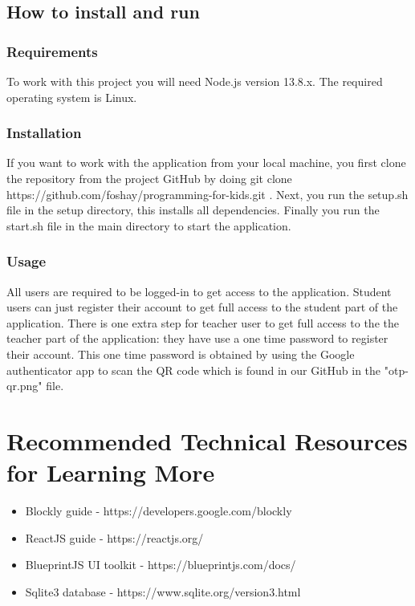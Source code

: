 \documentclass[draftclsnofoot,10pt,onecolumn]{IEEEtran}
\begin{document}

\subsection{How to install and run}
\subsubsection{Requirements}
To work with this project you will need Node.js version 13.8.x. The required operating system is Linux.
\subsubsection{Installation}
If you want to work with the application from your local machine, you first clone the repository from the project GitHub by doing git clone https://github.com/foshay/programming-for-kids.git .
Next, you run the setup.sh file in the setup directory, this installs all dependencies. Finally you run the start.sh file in the main directory to start the application. 
\subsubsection{Usage}
All users are required to be logged-in to get access to the application. Student users can just register their account to get full access to the student part of the application. There is one extra step for teacher user to get full access to the the teacher part of the application: they have use a one time password to register their account. This one time password is obtained by using the Google authenticator app to scan the QR code which is found in our GitHub in the "otp-qr.png" file.

\clearpage
\section{Recommended Technical Resources for Learning More}
\begin{itemize}
    \item Blockly guide - https://developers.google.com/blockly
    \item ReactJS guide - https://reactjs.org/
    \item BlueprintJS UI toolkit - https://blueprintjs.com/docs/
    \item Sqlite3 database - https://www.sqlite.org/version3.html
\end{itemize}
\end{document}

